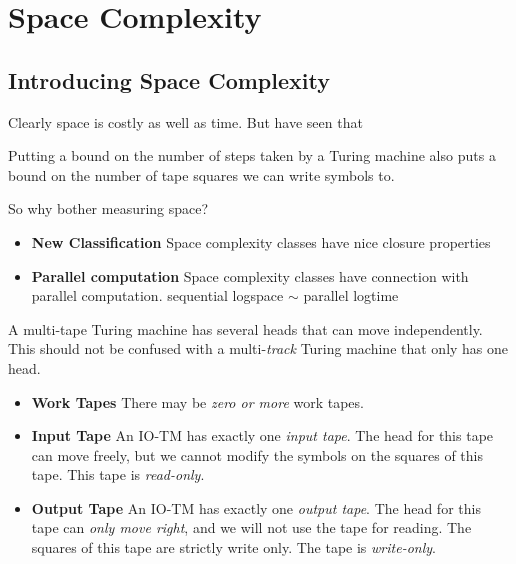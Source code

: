 
\chapter{Space Complexity}



\section{Introducing Space Complexity}

Clearly space is costly as well as time.
But have seen that


Putting a bound on the number of steps taken 
by a Turing machine also puts a bound on the 
number of tape squares we can write symbols to. 

So why bother measuring space?

\begin{itemize}   
\renewcommand{\labelitemi}{$\Box$}
\item \textbf{New Classiﬁcation} 
Space complexity classes have nice closure properties
\item \textbf{Parallel computation} 
Space complexity classes have connection with parallel computation.
sequential logspace $\sim$ parallel logtime
\end{itemize} 

\frmrule



A multi-tape Turing machine has several heads that 
can move independently. This should not be confused with 
a multi-\textit{track} Turing machine that only has one 
head. 

\begin{itemize}   
\renewcommand{\labelitemi}{$\Box$}
\item \textbf{Work Tapes} 
There may be \textit{zero or more} work tapes.

\item \textbf{Input Tape} 
An IO-TM has exactly one \textit{input tape}. 
The head for this tape can move freely, but we 
cannot modify the symbols on the squares of this tape. 
This tape is \textit{read-only}. 
\item \textbf{Output Tape} 
An IO-TM has exactly one \textit{output tape}. 
The head for this tape can \textit{only move right}, and we 
will not use the tape for reading.
The squares of this tape are strictly write only.  
The tape is \textit{write-only}. 
\end{itemize} 


